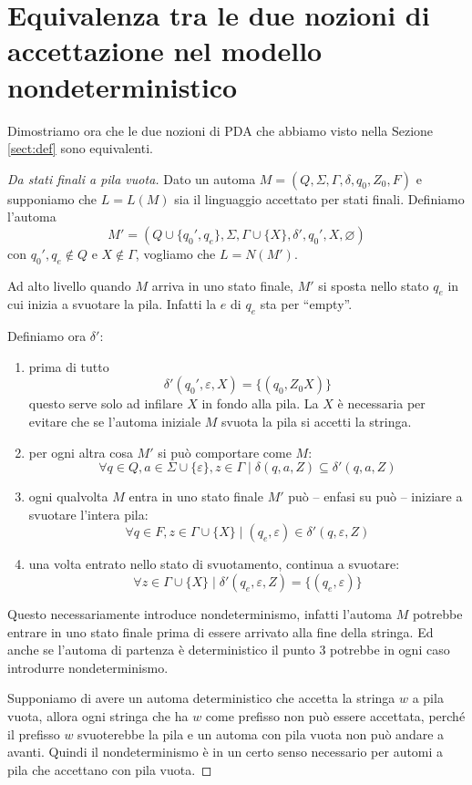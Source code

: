 \documentclass[12pt]{report}
\theoremstyle{definition}
\begin{document}
\section{Equivalenza tra le due nozioni di accettazione nel modello nondeterministico}\label{sect:eq-nondet}
Dimostriamo ora che le due nozioni di PDA che abbiamo visto nella Sezione \ref{sect:def} sono equivalenti.
\begin{proof}[Da stati finali a pila vuota]
Dato un automa $M = (Q, \Sigma, \Gamma, \delta, q_0, Z_0, F)$ e supponiamo che $L = L(M)$ sia il linguaggio accettato per stati finali.
Definiamo l'automa 
$$M' = (Q \cup \{q_0', q_e\}, \Sigma, \Gamma \cup \{X\}, \delta', q_0', X, \varnothing)$$
con $q_0', q_e \not \in Q$ e $X \not \in \Gamma$, vogliamo che $L= N(M')$.

Ad alto livello quando $M$ arriva in uno stato finale, $M'$ si sposta nello stato $q_e$ in cui inizia a svuotare la pila.
Infatti la $e$ di $q_e$ sta per ``empty''.

Definiamo ora $\delta'$:
\begin{enumerate}
	\item prima di tutto 
		$$ \delta'(q_0', \varepsilon, X) = \{(q_0, Z_0X)\} $$
		questo serve solo ad infilare $X$ in fondo alla pila.
		La $X$ è necessaria per evitare che se l'automa iniziale $M$ svuota la pila si accetti la stringa.
	\item per ogni altra cosa $M'$ si può comportare come $M$:
		$$ \forall q \in Q, a \in \Sigma \cup \{\varepsilon\}, z \in \Gamma \mid \delta(q, a, Z) \subseteq \delta'(q, a, Z) $$
	\item ogni qualvolta $M$ entra in uno stato finale $M'$ può -- enfasi su può -- iniziare a svuotare l'intera pila:
		$$ \forall q \in F, z \in \Gamma \cup \{X\} \mid (q_e, \varepsilon) \in \delta'(q, \varepsilon, Z) $$
	\item una volta entrato nello stato di svuotamento, continua a svuotare:
		$$ \forall z \in \Gamma \cup \{X\} \mid \delta'(q_e, \varepsilon, Z) = \{(q_e, \varepsilon)\}$$ 
\end{enumerate}

Questo necessariamente introduce nondeterminismo, infatti l'automa $M$ potrebbe entrare in uno stato finale prima di essere arrivato alla fine della stringa.
Ed anche se l'automa di partenza è deterministico il punto $3$ potrebbe in ogni caso introdurre nondeterminismo.

Supponiamo di avere un automa deterministico che accetta la stringa $w$ a pila vuota, allora ogni stringa che ha $w$ come prefisso non può essere accettata, perché il prefisso $w$ svuoterebbe la pila e un automa con pila vuota non può andare a avanti.
Quindi il nondeterminismo è in un certo senso necessario per automi a pila che accettano con pila vuota.
\end{proof}
\end{document}
